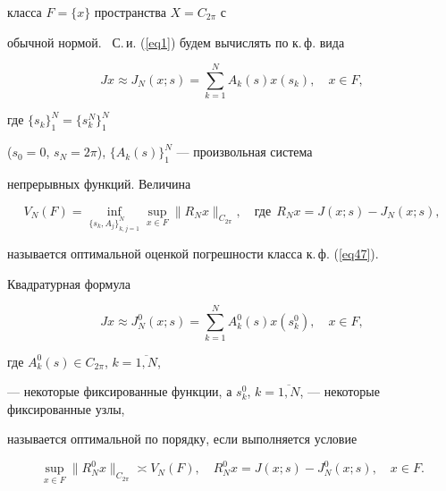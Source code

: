 класса $F = \{x\}$ пространства $X = C_{2\pi}$ с


обычной нормой. \ С.\,и. (\ref{eq1}) будем вычислять по к.\,ф. вида


\begin{equation}\label{eq47}


Jx\approx J_N(x;s) = \sum_{k=1}^N A_k(s)


x(s_k),\quad x\in F,


\end{equation}


где $\{s_k\}_1^N = \{s_k^N\}_1^N$


($s_0 = 0$, $s_N = 2\pi$), $\{A_k(s)\}^N_1$ --- произвольная система


непрерывных функций. Величина


$$


V_N(F) = \inf_{\{s_k,A_j\}_{k,j=1}^N}


\sup_{x\in F}\|R_Nx\|_{C_{2\pi}},\quad\text{где}


\ \ R_Nx = J(x;s) - J_N(x;s),


$$


называется оптимальной оценкой погрешности класса к.\,ф. (\ref{eq47}).





\begin{defnnonum}


Квадратурная формула


$$


Jx\approx J_N^0(x;s) = \sum_{k=1}^N


A_k^0(s) x(s_k^0),\quad x\in F,


$$


где $A_k^0(s)\in C_{2\pi}$, $k=\overline{1,N}$,


--- некоторые фиксированные функции, а $s_k^0$, $k =


\overline{1,N}$, --- некоторые фиксированные узлы,


называется оптимальной по порядку, если выполняется условие


$$


\sup_{x\in F}\|R_N^0x\|_{C_{2\pi}}


\asymp V_N(F),\quad R_N^0x = J(x;s) -


J_N^0(x;s),\quad x\in F.


$$


\end{defnnonum}





